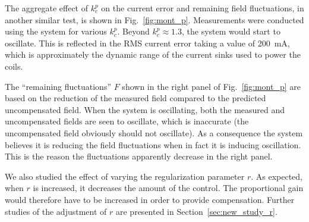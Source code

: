 
The aggregate effect of $k_c^p$ on the current error and remaining
field fluctuations, in another similar test, is shown in
Fig.~\ref{fig:mont_p}.  Measurements were conducted using the system
for various $k_c^p$.  Beyond $k_c^p\approx 1.3$, the system would
start to oscillate.  This is reflected in the RMS current error taking
a value of 200~mA, which is approximately the dynamic range of the
current sinks used to power the coils.

The ``remaining fluctuations'' $F$ shown in the right panel of
Fig.~\ref{fig:mont_p} are based on the reduction of the measured field
compared to the predicted uncompensated field.  When the system is
oscillating, both the measured and uncompensated fields are seen to
oscillate, which is inaccurate (the uncompensated field obviously
should not oscillate).  As a consequence the system believes it is
reducing the field fluctuations when in fact it is inducing
oscillation.  This is the reason the fluctuations apparently decrease
in the right panel.




We also studied the effect of varying the regularization parameter $r$.
As expected, when $r$ is increased, it decreases the amount of the
control.  The proportional gain would therefore have to be increased
in order to provide compensation.  Further studies of the adjustment
of $r$ are presented in Section~\ref{sec:new_study_r}.




